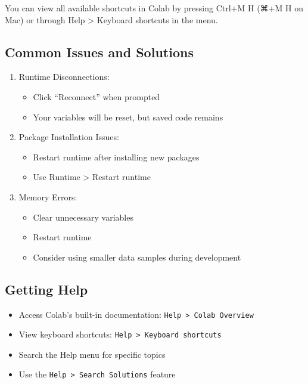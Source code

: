 \documentclass[
  letterpaper,
  DIV=11,
  numbers=noendperiod]{scrreprt}
\providecommand{\tightlist}{%
  \setlength{\itemsep}{0pt}\setlength{\parskip}{0pt}}\usepackage{longtable,booktabs,array}
\begin{document}
You can view all available shortcuts in Colab by pressing Ctrl+M H (⌘+M
H on Mac) or through Help \textgreater{} Keyboard shortcuts in the menu.

\hypertarget{common-issues-and-solutions}{%
\subsection{Common Issues and
Solutions}\label{common-issues-and-solutions}}

\begin{enumerate}
\def\labelenumi{\arabic{enumi}.}
\tightlist
\item
  Runtime Disconnections:

  \begin{itemize}
  \tightlist
  \item
    Click ``Reconnect'' when prompted
  \item
    Your variables will be reset, but saved code remains
  \end{itemize}
\item
  Package Installation Issues:

  \begin{itemize}
  \tightlist
  \item
    Restart runtime after installing new packages
  \item
    Use Runtime \textgreater{} Restart runtime
  \end{itemize}
\item
  Memory Errors:

  \begin{itemize}
  \tightlist
  \item
    Clear unnecessary variables
  \item
    Restart runtime
  \item
    Consider using smaller data samples during development
  \end{itemize}
\end{enumerate}

\hypertarget{getting-help}{%
\subsection{Getting Help}\label{getting-help}}

\begin{itemize}
\tightlist
\item
  Access Colab's built-in documentation:
  \texttt{Help\ \textgreater{}\ Colab\ Overview}
\item
  View keyboard shortcuts:
  \texttt{Help\ \textgreater{}\ Keyboard\ shortcuts}
\item
  Search the Help menu for specific topics
\item
  Use the \texttt{Help\ \textgreater{}\ Search\ Solutions} feature
\end{itemize}
\end{document}
